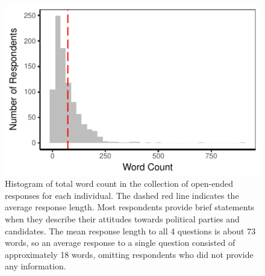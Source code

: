 \documentclass[12pt]{article}
\begin{document}
\begin{figure}[h]\centering
\includegraphics{../fig/yg_wc.pdf}
\caption{Histogram of total word count in the collection of open-ended responses for each individual. The dashed red line indicates the average response length. Most respondents provide brief statements when they describe their attitudes towards political parties and candidates. The mean response length to all 4 questions is about 73 words, so an average response to a single question consisted of approximately 18 words, omitting respondents who did not provide any information.}\label{fig:yg_wc}
\end{figure}
\end{document}
